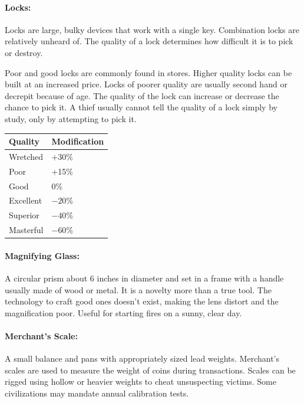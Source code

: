 \begin{multicols}{2}
\paragraph{Locks:}  Locks are large, bulky devices that work with a single key.  Combination locks are relatively unheard of.  The quality of a lock determines how difficult it is to pick or destroy.

Poor and good locks are commonly found in stores.  Higher quality locks can be built at an increased price.  Locks of poorer quality are usually second hand or decrepit because of age.  The quality of the lock can increase or decrease the chance to pick it.  A thief usually cannot tell the quality of a lock simply by study, only by attempting to pick it.

\noindent
\begin{minipage}{\columnwidth}

\label{lockqual}
\noindent
\begin{tabular}{|p{}|p{}|}
\hline
Quality		& Modification \\
\hline\hline
\rowcolor[gray]{.9}Wretched	& +30\% \\
Poor		& +15\% \\
\rowcolor[gray]{.9}Good		& 0\% \\
Excellent	& $-20$\% \\
\rowcolor[gray]{.9}Superior	& $-40$\% \\
Masterful	& $-60$\% \\
\hline
\end{tabular}

\end{minipage}

\paragraph{Magnifying Glass:} A circular prism about 6 inches in diameter and set in a frame with a handle usually made of wood or metal.  It is a novelty more than a true tool.  The technology to craft good ones doesn't exist, making the lens distort and the magnification poor.  Useful for starting fires on a sunny, clear day.

\paragraph{Merchant's Scale:}  A small balance and pans with appropriately sized lead weights.  Merchant's scales are used to measure the weight of coins during transactions.  Scales can be rigged using hollow or heavier weights to cheat unsuspecting victims.  Some civilizations may mandate annual calibration tests.  


\end{multicols}
